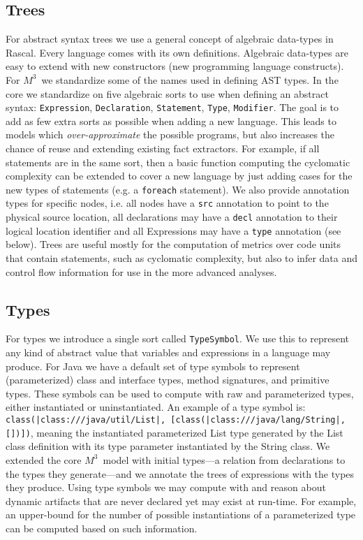 \documentclass[conference]{IEEEtran}
\newcommand{\loc}[1]{\small{\texttt{#1}}\xspace}
\newcommand{\mthree}{\ensuremath{M^3}\!\xspace}
\begin{document}
\subsection{Trees} For abstract syntax trees we use a general concept of
algebraic data-types in Rascal. Every language comes with its own definitions.
Algebraic data-types are easy to extend with new constructors (new programming
language constructs). For \mthree\ we standardize some of the names used in
defining AST types. In the core we standardize on five algebraic sorts to use
when defining an abstract syntax: \texttt{Expression}, \texttt{Declaration},
\texttt{Statement}, \texttt{Type}, \texttt{Modifier}. The goal is to add as
few extra sorts as possible when adding a new language. This leads to models
which \emph{over-approximate} the possible programs, but also increases the
chance of reuse and extending existing fact extractors. For example, if all
statements are in the same sort, then a basic function computing the
cyclomatic complexity can be extended to cover a new language by just adding
cases for the new types of statements (e.g. a \texttt{foreach} statement). We
also provide annotation types for specific nodes, i.e. all nodes have a
\texttt{src} annotation to point to the physical source location, all
declarations may have a \texttt{decl} annotation to their logical location
identifier and all Expressions may have a \texttt{type} annotation (see
below).
%
Trees are useful mostly for the computation of metrics over code units that
contain statements, such as cyclomatic complexity, but also to infer data and
control flow information for use in the more advanced analyses. 


\subsection{Types} For types we introduce a single sort called
\texttt{TypeSymbol}. We use this to represent any kind of abstract value that
variables and expressions in a language may produce. For Java we have a
default set of type symbols to represent (parameterized) class and interface
types, method signatures, and primitive types. These symbols can be used to
compute with raw and parameterized types, either instantiated or
uninstantiated. An example of a type symbol is:
\loc{class(|class:///java/util/List|, [class(|class:///java/lang/String|,[])])}, 
meaning the instantiated
parameterized List type generated by the List class definition with its type
parameter instantiated by the String class. We extended the core \mthree\
model with initial types---a relation from declarations to the types they
generate---and we annotate the trees of expressions with the types they produce.
Using type symbols we may compute with and reason about dynamic artifacts that
are never declared yet may exist at run-time. For example, an upper-bound for
the number of possible instantiations of a parameterized type can be computed
based on such information.
\end{document}
